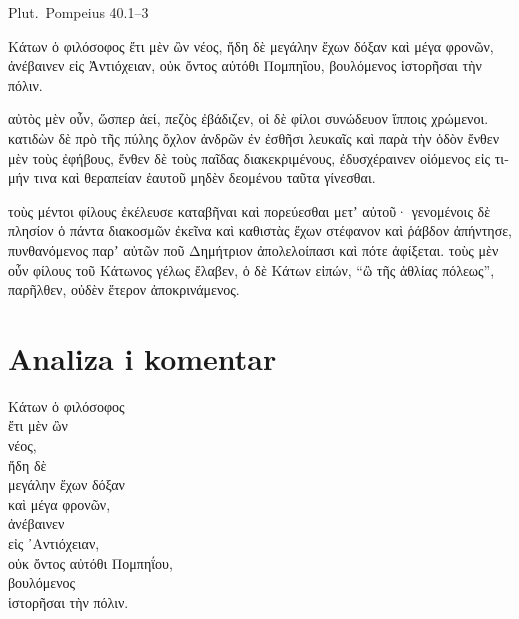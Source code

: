 Plut.\ Pompeius 40.1–3


\medskip


{\large

\begin{greek}

\noindent  Κάτων ὁ φιλόσοφος ἔτι μὲν ὢν νέος, ἤδη δὲ μεγάλην ἔχων δόξαν καὶ μέγα φρονῶν, ἀνέβαινεν εἰς Ἀντιόχειαν, οὐκ ὄντος αὐτόθι Πομπηΐου, βουλόμενος ἱστορῆσαι τὴν πόλιν.

\noindent αὐτὸς μὲν οὖν, ὥσπερ ἀεί, πεζὸς ἐβάδιζεν, οἱ δὲ φίλοι συνώδευον ἵπποις χρώμενοι. κατιδὼν δὲ πρὸ τῆς πύλης ὄχλον ἀνδρῶν ἐν ἐσθῆσι λευκαῖς καὶ παρὰ τὴν ὁδὸν ἔνθεν μὲν τοὺς ἐφήβους, ἔνθεν δὲ τοὺς παῖδας διακεκριμένους, ἐδυσχέραινεν οἰόμενος εἰς τιμήν τινα καὶ θεραπείαν ἑαυτοῦ μηδὲν δεομένου ταῦτα γίνεσθαι.

\noindent τοὺς μέντοι φίλους ἐκέλευσε καταβῆναι καὶ πορεύεσθαι μετʼ αὐτοῦ· γενομένοις δὲ πλησίον ὁ πάντα διακοσμῶν ἐκεῖνα καὶ καθιστὰς ἔχων στέφανον καὶ ῥάβδον ἀπήντησε, πυνθανόμενος παρʼ αὐτῶν ποῦ Δημήτριον ἀπολελοίπασι καὶ πότε ἀφίξεται. τοὺς μὲν οὖν φίλους τοῦ Κάτωνος γέλως ἔλαβεν, ὁ δὲ Κάτων εἰπών, ``ὢ τῆς ἀθλίας πόλεως'', παρῆλθεν, οὐδὲν ἕτερον ἀποκρινάμενος.

\end{greek}

}

\newpage

\section*{Analiza i komentar}


{\large
\begin{greek}
\noindent Κάτων ὁ φιλόσοφος \\
\tabto{2em} ἔτι μὲν ὢν \\
\tabto{4em} νέος, \\
\tabto{2em} ἤδη δὲ \\
\tabto{4em} μεγάλην ἔχων δόξαν \\
\tabto{2em} καὶ μέγα φρονῶν, \\
ἀνέβαινεν \\
\tabto{2em} εἰς ᾿Αντιόχειαν, \\
οὐκ ὄντος αὐτόθι Πομπηΐου, \\
βουλόμενος \\
\tabto{2em} ἱστορῆσαι τὴν πόλιν. \\

\end{greek}
}


